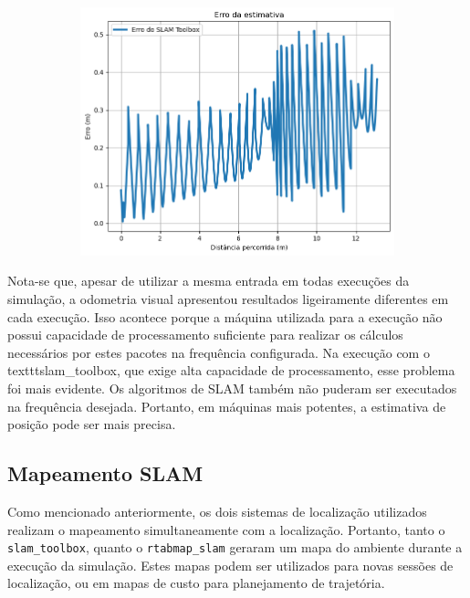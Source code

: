 \documentclass[repeatfields,xlists,xpacks,oneside,yearsonly]{ufrgscca}
\begin{document}
\begin{figure}[H]
\begin{subfigure}{0.5\linewidth}
{            \includegraphics[width=0.98\linewidth]{localization-slam-toolbox-error-new.png}\\
        }
    \end{subfigure}
\end{figure}

Nota-se que, apesar de utilizar a mesma entrada em todas execuções da
simulação, a odometria visual apresentou resultados ligeiramente
diferentes em cada execução. Isso acontece porque a máquina utilizada
para a execução não possui capacidade de processamento suficiente
para realizar os cálculos necessários por estes pacotes na frequência
configurada. Na execução com o texttt{slam\_toolbox}, que exige alta
capacidade de processamento, esse problema foi mais evidente. Os
algoritmos de SLAM também não puderam ser executados na frequência
desejada. Portanto, em máquinas mais potentes, a estimativa de
posição pode ser mais precisa.

\subsection{Mapeamento SLAM}

Como mencionado anteriormente, os dois sistemas de localização
utilizados realizam o mapeamento simultaneamente com a localização.
Portanto, tanto o \texttt{slam\_toolbox}, quanto o
\texttt{rtabmap\_slam} geraram um mapa do ambiente durante a execução
da simulação. Estes mapas podem ser utilizados para novas sessões de
localização, ou em mapas de custo para planejamento de trajetória.
\end{document}
